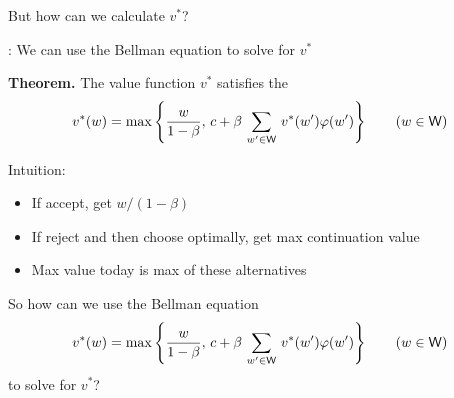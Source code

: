 \begin{frame}

    But how can we calculate $v^*$?

    \vspace{0.4em}
    : We can use the Bellman equation to solve for $v^*$

    \vspace{0.4em}
    {\bf Theorem.} The value function $v^*$ satisfies the 
    \begin{equation*}
        v^*(w) = 
        \max \left\{
            \frac{w}{1-\beta}
            ,\,
            c + \beta \, \sum_{w' \in \mathsf W} \, v^*(w') \varphi(w')
            \right\}
            \qquad (w \in \mathsf W)
    \end{equation*}

    Intuition:
    \begin{itemize}
        \item If accept, get $w/(1-\beta)$
        \item If reject and then choose optimally, get max continuation value
        \item Max value today is max of these alternatives
    \end{itemize}


\end{frame}


\begin{frame}

    So how can we use the Bellman equation
    \begin{equation*}
        v^*(w) = 
        \max \left\{
            \frac{w}{1-\beta}
            ,\,
            c + \beta \, \sum_{w' \in \mathsf W} \, v^*(w') \varphi(w')
            \right\}
            \qquad (w \in \mathsf W)
    \end{equation*}
    to solve for $v^*$?


\end{frame}




